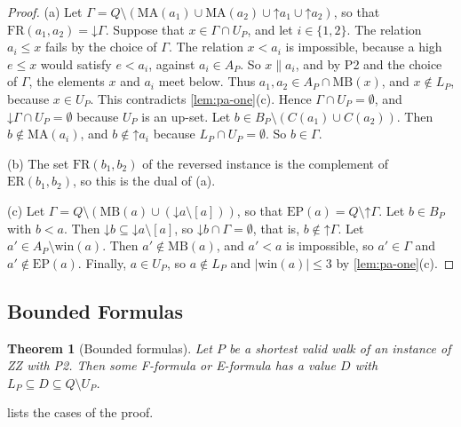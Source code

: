 \documentclass[pdflatex,sn-mathphys-num]{sn-jnl}%
\theoremstyle{thmstyleone}%
\newtheorem{theorem}{Theorem}%
\theoremstyle{thmstyletwo}%
\theoremstyle{thmstylethree}%
\newcommand{\dn}{\mathord{\downarrow}}%
\newcommand{\upp}{\mathord{\uparrow}}%
\newcommand{\MB}{\mathrm{MB}}%
\newcommand{\MA}{\mathrm{MA}}%
\newcommand{\win}{\mathrm{win}}%
\newcommand{\FR}{\mathrm{FR}}%
\newcommand{\ER}{\mathrm{ER}}%
\newcommand{\EP}{\mathrm{EP}}%
\begin{document}
\begin{proof}
(a) Let $\Gamma = Q \setminus (\MA(a_1) \cup \MA(a_2) \cup \upp a_1 \cup \upp a_2)$, so that $\FR(a_1, a_2) = \dn \Gamma$.
Suppose that $x \in \Gamma \cap U_P$, and let $i \in \{1, 2\}$.
The relation $a_i \leq x$ fails by the choice of $\Gamma$.
The relation $x < a_i$ is impossible, because a high $e \leq x$ would satisfy $e < a_i$, against $a_i \in A_P$.
So $x \parallel a_i$, and by P2 and the choice of $\Gamma$, the elements $x$ and $a_i$ meet below.
Thus $a_1, a_2 \in A_P \cap \MB(x)$, and $x \notin L_P$, because $x \in U_P$.
This contradicts \cref{lem:pa-one}(c).
Hence $\Gamma \cap U_P = \emptyset$, and $\dn \Gamma \cap U_P = \emptyset$ because $U_P$ is an up-set.
Let $b \in B_P \setminus (C(a_1) \cup C(a_2))$.
Then $b \notin \MA(a_i)$, and $b \notin \upp a_i$ because $L_P \cap U_P = \emptyset$.
So $b \in \Gamma$.

(b) The set $\FR(b_1, b_2)$ of the reversed instance is the complement of $\ER(b_1, b_2)$, so this is the dual of (a).

(c) Let $\Gamma = Q \setminus (\MB(a) \cup (\dn a \setminus [a]))$, so that $\EP(a) = Q \setminus \upp \Gamma$.
Let $b \in B_P$ with $b < a$.
Then $\dn b \subseteq \dn a \setminus [a]$, so $\dn b \cap \Gamma = \emptyset$, that is, $b \notin \upp \Gamma$.
Let $a' \in A_P \setminus \win(a)$.
Then $a' \notin \MB(a)$, and $a' < a$ is impossible, so $a' \in \Gamma$ and $a' \notin \EP(a)$.
Finally, $a \in U_P$, so $a \notin L_P$ and $|\win(a)| \leq 3$ by \cref{lem:pa-one}(c).
\end{proof}

\subsection{Bounded Formulas}
\label{sec:pa-formulas}

\begin{theorem}[Bounded formulas]
\label{thm:pa-formulas}
Let $P$ be a shortest valid walk of an instance of ZZ with P2.
Then some F-formula or E-formula has a value $D$ with $L_P \subseteq D \subseteq Q \setminus U_P$.
\end{theorem}

 lists the cases of the proof.
\end{document}
